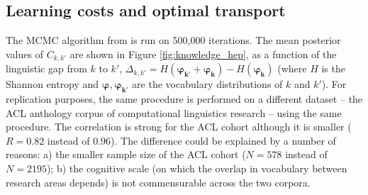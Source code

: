 \documentclass{article}
\begin{document}


\subsection{\label{appendix:optimal_transport}Learning costs and optimal transport}

The MCMC algorithm from \citealt{pmlr-v162-chiu22b} is run on 500,000 iterations. The mean posterior values of $C_{k,k'}$ are shown in Figure \ref{fig:knowledge_hep}, as a function of the linguistic gap from $k$ to $k'$, $\Delta_{k,k'}=H(\bm{\varphi_{k'}}+\bm{\varphi_k})-H(\bm{\varphi_k})$ (where $H$ is the Shannon entropy and $\bm{\varphi_{}},\bm{\varphi_{k'}}$ are the vocabulary distributions of $k$ and $k'$). For replication purposes, the same procedure is performed  on a different dataset -- the ACL anthology corpus  of computational linguistics research \citep{acl_anthology_corpus} -- using the same procedure. The correlation is strong for the ACL cohort although it is smaller ($R=0.82$ instead of $0.96$). The difference could be explained by a number of reasons: a) the smaller sample size of the ACL cohort ($N = 578$ instead of $N = 2195$); b) the cognitive scale (on which the overlap in vocabulary between research areas depends) is not commensurable across the two corpora.

\begin{figure}[h]
\centering
\end{figure}
\end{document}
